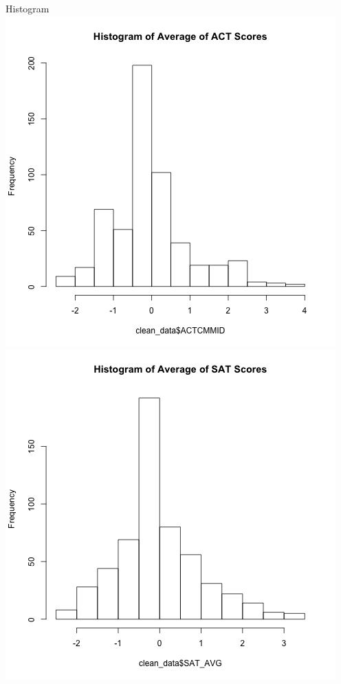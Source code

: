 Histogram
\includegraphics{../../images/histogram_ACT_avg.png}
\includegraphics{../../images/histogram_SAT_avg.png}
